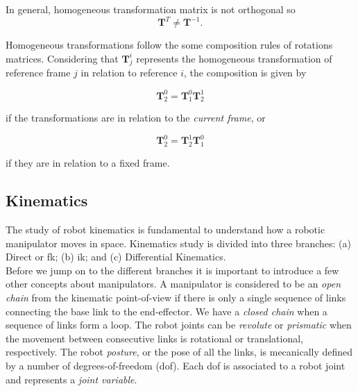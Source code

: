 In general, homogeneous transformation matrix is not orthogonal so 
\begin{equation}
    \boldsymbol{T}^{T} \neq \boldsymbol{T}^{-1}.
\end{equation}

Homogeneous transformations follow the some composition rules of rotations matrices. Considering that $\boldsymbol{T}^{i}_{j}$ represents the homogeneous transformation of reference frame $j$ in relation to reference $i$, the composition is given by

\begin{equation}
    \boldsymbol{T}^{0}_{2} = \boldsymbol{T}^{0}_{1}\boldsymbol{T}^{1}_{2}
\end{equation}

if the transformations are in relation to the \emph{current frame}, or

\begin{equation}
    \boldsymbol{T}^{0}_{2} = \boldsymbol{T}^{1}_{2}\boldsymbol{T}^{0}_{1}
\end{equation}

if they are in relation to a fixed frame.



\subsection{Kinematics}
\label{subsec:kinematics}

The study of robot kinematics is fundamental to understand how a robotic manipulator moves in space. Kinematics study is divided into three branches: (a) Direct or \gls{fk}; (b) \gls{ik}; and (c) Differential Kinematics.\\

Before we jump on to the different branches it is important to introduce a few other concepts about manipulators. A manipulator is considered to be an \emph{open chain} from the kinematic point-of-view if there is only a single sequence of links connecting the base link to the end-effector. We have a \emph{closed chain} when a sequence of links form a loop. The robot joints can be \emph{revolute} or \emph{prismatic} when the movement between consecutive links is rotational or translational, respectively. The robot \emph{posture}, or the pose of all the links, is mecanically defined by a number of degrees-of-freedom (\gls{dof}). Each \gls{dof} is associated to a robot joint and represents a \emph{joint variable}.

